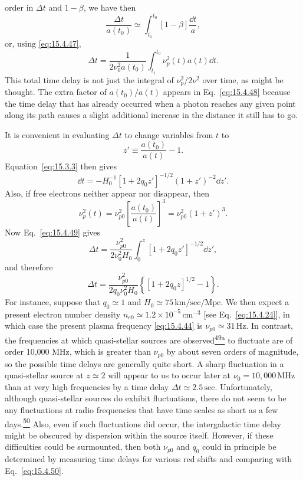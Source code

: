order in \(\Delta t\) and \(1-\beta\), we have then
\begin{equation}
  \frac{\Delta t}{a(t_0)}
  \simeq
  \int_{t_1}^{t_0}[1-\beta]\frac{\dd t}{a},
  \tag{15.4.48}\label{eq:15.4.48}
\end{equation}
or, using \eqref{eq:15.4.47},
\begin{equation}
  \Delta t
  =
  \frac1{2\nu_0^2a(t_0)}
  \int_{t_1}^{t_0}\nu_p^2(t)a(t)\dd t.
  \tag{15.4.49}\label{eq:15.4.49}
\end{equation}
This total time delay is not just the integral of \(\nu_p^2/2\nu^2\) over
time, as might be thought. The extra factor of \(a(t_0)/a(t)\) appears in
Eq.~\eqref{eq:15.4.48} because the time delay that has already occurred when
a photon reaches any given point along its path causes a slight additional
increase in the distance it still has to go.

It is convenient in evaluating \(\Delta t\) to change variables from \(t\) to
\[
  z'\equiv\frac{a(t_0)}{a(t)}-1.
\]
Equation~\eqref{eq:15.3.3} then gives
\[
  \dd t
  =
  -H_0^{-1}[1+2q_0z']^{-1/2}(1+z')^{-2}\dd z'.
\]
Also, if free electrons neither appear nor disappear, then
\[
  \nu_p^2(t)
  =
  \nu_{p0}^2\left[\frac{a(t_0)}{a(t)}\right]^3
  =
  \nu_{p0}^2(1+z')^3.
\]
Now Eq.~\eqref{eq:15.4.49} gives
\[
  \Delta t
  =
  \frac{\nu_{p0}^2}{2\nu_0^2H_0}
  \int_0^z[1+2q_0z']^{-1/2}\dd z',
\]
and therefore
\begin{equation}
  \Delta t
  =
  \frac{\nu_{p0}^2}{2q_0\nu_0^2H_0}
  \left\{
    [1+2q_0z]^{1/2}-1
  \right\}.
  \tag{15.4.50}\label{eq:15.4.50}
\end{equation}
For instance, suppose that \(q_0\simeq1\) and
\(H_0\simeq75\,\mathrm{km/sec/Mpc}\). We then expect a present electron
number density \(n_{e0}\simeq1.2\times10^{-5}\,\mathrm{cm^{-3}}\) [see
Eq.~\eqref{eq:15.4.24}], in which case the present plasma frequency
\eqref{eq:15.4.44} is \(\nu_{p0}\simeq31\,\mathrm{Hz}\). In contrast, the
frequencies at which quasi-stellar sources are
observed\hyperref[ch15-ref-49a]{\textsuperscript{49a}} to fluctuate are of
order 10,000 MHz, which is greater than \(\nu_{p0}\) by about seven orders of
magnitude, so the possible time delays are generally quite short. A sharp
fluctuation in a quasi-stellar source at \(z\simeq2\) will appear to us to
occur later at \(\nu_0=10{,}000\,\mathrm{MHz}\) than at very high frequencies
by a time delay \(\Delta t\simeq2.5\,\mathrm{sec}\). Unfortunately, although
quasi-stellar sources do exhibit fluctuations, there do not seem to be any
fluctuations at radio frequencies that have time scales as short as a few
days.\hyperref[ch15-ref-50]{\textsuperscript{50}} Also, even if such
fluctuations did occur, the intergalactic time delay might be obscured by
dispersion within the source itself. However, if these difficulties could be
surmounted, then both \(\nu_{p0}\) and \(q_0\) could in principle be
determined by measuring time delays for various red shifts and comparing with
Eq.~\eqref{eq:15.4.50}.


